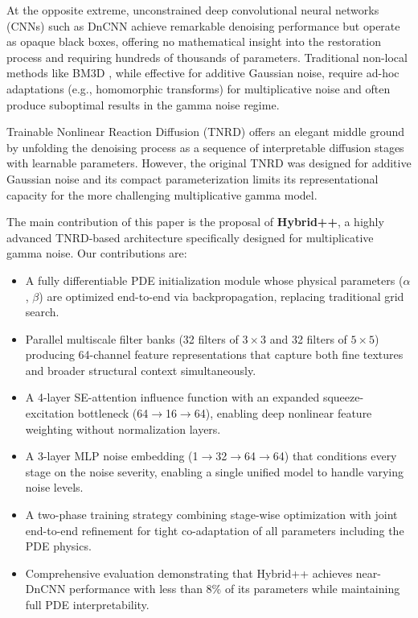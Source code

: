 \documentclass[conference]{IEEEtran}
\begin{document}
At the opposite extreme, unconstrained deep convolutional neural networks (CNNs) such as DnCNN \cite{zhang2017beyond} achieve remarkable denoising performance but operate as opaque black boxes, offering no mathematical insight into the restoration process and requiring hundreds of thousands of parameters. Traditional non-local methods like BM3D \cite{dabov2007bm3d}, while effective for additive Gaussian noise, require ad-hoc adaptations (e.g., homomorphic transforms) for multiplicative noise and often produce suboptimal results in the gamma noise regime.

Trainable Nonlinear Reaction Diffusion (TNRD) \cite{chen2017tnrd} offers an elegant middle ground by unfolding the denoising process as a sequence of interpretable diffusion stages with learnable parameters. However, the original TNRD was designed for additive Gaussian noise and its compact parameterization limits its representational capacity for the more challenging multiplicative gamma model.

The main contribution of this paper is the proposal of \textbf{Hybrid++}, a highly advanced TNRD-based architecture specifically designed for multiplicative gamma noise. Our contributions are:
\begin{itemize}
\item A fully differentiable PDE initialization module whose physical parameters ($\alpha$, $\beta$) are optimized end-to-end via backpropagation, replacing traditional grid search.
\item Parallel multiscale filter banks (32 filters of $3{\times}3$ and 32 filters of $5{\times}5$) producing 64-channel feature representations that capture both fine textures and broader structural context simultaneously.
\item A 4-layer SE-attention influence function with an expanded squeeze-excitation bottleneck (64$\to$16$\to$64), enabling deep nonlinear feature weighting without normalization layers.
\item A 3-layer MLP noise embedding (1$\to$32$\to$64$\to$64) that conditions every stage on the noise severity, enabling a single unified model to handle varying noise levels.
\item A two-phase training strategy combining stage-wise optimization with joint end-to-end refinement for tight co-adaptation of all parameters including the PDE physics.
\item Comprehensive evaluation demonstrating that Hybrid++ achieves near-DnCNN performance with less than 8\% of its parameters while maintaining full PDE interpretability.
\end{itemize}
\end{document}
